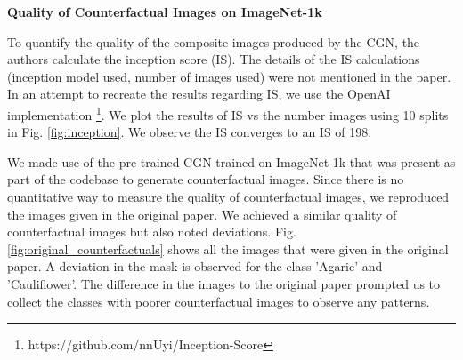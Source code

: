     

\textbf{Quality of Counterfactual Images on ImageNet-1k}


To quantify the quality of the composite images produced by the CGN, the authors calculate the inception score (IS). The details of the IS calculations (inception model used, number of images used) were not mentioned in the paper. In an attempt to recreate the results regarding IS, we use the OpenAI implementation \footnote{https://github.com/nnUyi/Inception-Score}. We plot the results of IS vs the number images using 10 splits in Fig. \ref{fig:inception}. We observe the IS converges to an IS of 198.


We made use of the pre-trained CGN trained on ImageNet-1k that was present as part of the codebase to generate counterfactual images. 
Since there is no quantitative way to measure the quality of counterfactual images, we reproduced the images given in the original paper. We achieved a similar quality of counterfactual images but also noted deviations. 
Fig. \ref{fig:original_counterfactuals} shows all the images that were given in the original paper. A deviation in the mask is observed for the class 'Agaric' and 'Cauliflower'. 
The difference in the images to the original paper prompted us to collect the classes with poorer counterfactual images to observe any patterns. 

